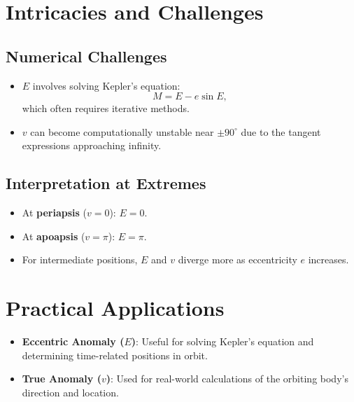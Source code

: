 \documentclass[11pt]{article}
\begin{document}
\section*{Intricacies and Challenges}
\subsection*{Numerical Challenges}
\begin{itemize}
    \item \(E\) involves solving Kepler's equation:
    \[
    M = E - e \sin E,
    \]
    which often requires iterative methods.
    \item \(v\) can become computationally unstable near \(\pm 90^\circ\) due to the tangent expressions approaching infinity.
\end{itemize}

\subsection*{Interpretation at Extremes}
\begin{itemize}
    \item At \textbf{periapsis} (\(v = 0\)): \(E = 0\).
    \item At \textbf{apoapsis} (\(v = \pi\)): \(E = \pi\).
    \item For intermediate positions, \(E\) and \(v\) diverge more as eccentricity \(e\) increases.
\end{itemize}

\section*{Practical Applications}
\begin{itemize}
    \item \textbf{Eccentric Anomaly (\(E\))}: Useful for solving Kepler's equation and determining time-related positions in orbit.
    \item \textbf{True Anomaly (\(v\))}: Used for real-world calculations of the orbiting body's direction and location.
\end{itemize}
\end{document}
